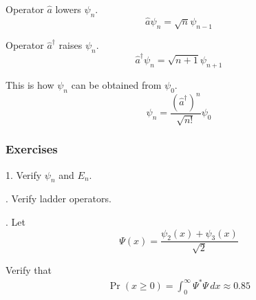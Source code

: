 Operator $\hat a$ lowers $\psi_n$.
\begin{equation*}
\hat a\psi_n=\sqrt n\psi_{n-1}
\end{equation*}

Operator $\hat a^\dag$ raises $\psi_n$.
\begin{equation*}
\hat a^\dag\psi_n=\sqrt{n+1}\psi_{n+1}
\end{equation*}

This is how $\psi_n$ can be obtained from $\psi_0$.
\begin{equation*}
\psi_n=\frac{(\hat a^\dag)^n}{\sqrt{n!}}\psi_0
\end{equation*}

\subsubsection*{Exercises}

1. Verify $\psi_n$ and $E_n$.

. Verify ladder operators.

. Let
\begin{equation*}
\Psi(x)=\frac{\psi_2(x)+\psi_3(x)}{\sqrt2}
\end{equation*}

Verify that
\begin{align*}
\Pr(x\ge0)=\int_0^\infty \Psi^*\Psi\,dx\approx0.85
\end{align*}


